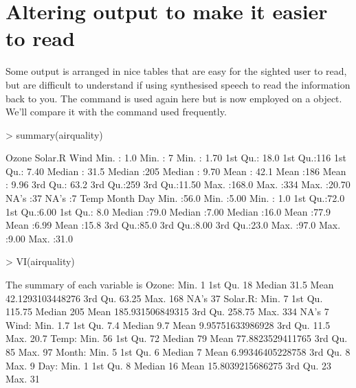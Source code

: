  
 
\section{Altering \R{} output to make it easier to read} 
 
Some \R{} output is arranged in nice tables that are easy for the sighted user to read, but are difficult to understand if using synthesised  speech to read the information back to you. The  command is used again here but is now employed on a  object. We'll compare it with the  command used frequently. 
\begin{Schunk}
\begin{Sinput}
> summary(airquality) 
\end{Sinput}
\begin{Soutput}
     Ozone          Solar.R         Wind      
 Min.   :  1.0   Min.   :  7   Min.   : 1.70  
 1st Qu.: 18.0   1st Qu.:116   1st Qu.: 7.40  
 Median : 31.5   Median :205   Median : 9.70  
 Mean   : 42.1   Mean   :186   Mean   : 9.96  
 3rd Qu.: 63.2   3rd Qu.:259   3rd Qu.:11.50  
 Max.   :168.0   Max.   :334   Max.   :20.70  
 NA's   :37      NA's   :7                    
      Temp          Month           Day      
 Min.   :56.0   Min.   :5.00   Min.   : 1.0  
 1st Qu.:72.0   1st Qu.:6.00   1st Qu.: 8.0  
 Median :79.0   Median :7.00   Median :16.0  
 Mean   :77.9   Mean   :6.99   Mean   :15.8  
 3rd Qu.:85.0   3rd Qu.:8.00   3rd Qu.:23.0  
 Max.   :97.0   Max.   :9.00   Max.   :31.0  
                                             
\end{Soutput}
\begin{Sinput}
> VI(airquality) 
\end{Sinput}
\begin{Soutput}

The summary of each variable is
Ozone: Min. 1   1st Qu. 18   Median 31.5   Mean 42.1293103448276   3rd Qu. 63.25   Max. 168   NA's 37  
Solar.R: Min. 7   1st Qu. 115.75   Median 205   Mean 185.931506849315   3rd Qu. 258.75   Max. 334   NA's 7  
Wind: Min. 1.7   1st Qu. 7.4   Median 9.7   Mean 9.95751633986928   3rd Qu. 11.5   Max. 20.7  
Temp: Min. 56   1st Qu. 72   Median 79   Mean 77.8823529411765   3rd Qu. 85   Max. 97  
Month: Min. 5   1st Qu. 6   Median 7   Mean 6.99346405228758   3rd Qu. 8   Max. 9  
Day: Min. 1   1st Qu. 8   Median 16   Mean 15.8039215686275   3rd Qu. 23   Max. 31  
\end{Soutput}
\end{Schunk}
 
